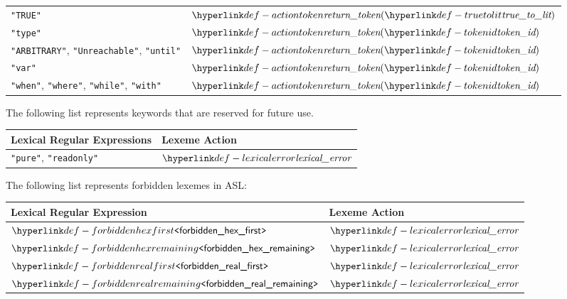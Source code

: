 \begin{center}
\begin{tabular}{ll}
\texttt{"TRUE"}          & $\actiontoken(\truetolit)$ \\
\texttt{"type"}          & $\actiontoken(\tokenid)$ \\
\texttt{"ARBITRARY"}, \texttt{"Unreachable"}, \texttt{"until"}         & $\actiontoken(\tokenid)$ \\
\texttt{"var"}           & $\actiontoken(\tokenid)$ \\
\texttt{"when"}, \texttt{"where"}, \texttt{"while"}, \texttt{"with"}          & $\actiontoken(\tokenid)$ \\
\hline
\end{tabular}
\end{center}

The following list represents keywords that are reserved for future use.
\begin{center}
\begin{tabular}{ll}
\textbf{Lexical Regular Expressions} & \textbf{Lexeme Action}\\
\hline
\texttt{"pure"}, \texttt{"readonly"} & $\lexicalerror$ \\
\hline
\end{tabular}
\end{center}

The following list represents forbidden lexemes in ASL:
\begin{center}
  \begin{tabular}{ll}
    \textbf{Lexical Regular Expression} & \textbf{Lexeme Action}\\
    \hline
    $\REforbiddenhexfirst$ & $\lexicalerror$ \\
    $\REforbiddenhexremaining$ & $\lexicalerror$ \\
    $\REforbiddenrealfirst$ & $\lexicalerror$ \\
    $\REforbiddenrealremaining$ & $\lexicalerror$ \\
    \hline
  \end{tabular}
\end{center}

